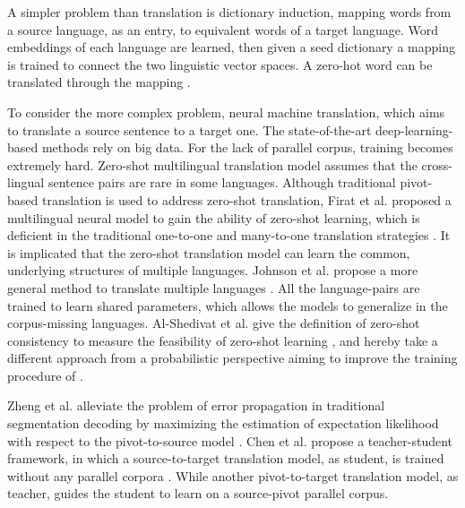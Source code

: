 \documentclass[sigconf, review]{acmart}
\begin{document}
A simpler problem than translation is dictionary induction, mapping words from a source language, as an entry, to equivalent words of a target language. Word embeddings of each language are learned, then given a seed dictionary a mapping is trained to connect the two linguistic vector spaces. A zero-hot word can be translated through the mapping \cite{nakashole2017knowledge}.

To consider the more complex problem, neural machine translation, which aims to translate a source sentence to a target one. The state-of-the-art deep-learning-based methods rely on big data. For the lack of parallel corpus, training becomes extremely hard. Zero-shot multilingual translation model assumes that the cross-lingual sentence pairs are rare in some languages. Although traditional pivot-based translation is used to address zero-shot translation, Firat et al. proposed a multilingual neural model to gain the ability of zero-shot learning, which is deficient in the traditional one-to-one and many-to-one translation strategies \cite{firat2016zero}. It is implicated that the zero-shot translation model can learn the common, underlying structures of multiple languages. Johnson et al. propose a more general method to translate multiple languages \cite{johnson2017google}. All the language-pairs are trained to learn shared parameters, which allows the models to generalize in the corpus-missing languages. Al-Shedivat et al. give the definition of zero-shot consistency to measure the feasibility of zero-shot learning \cite{al2019consistency}, and hereby take a different approach from a probabilistic perspective aiming to improve the training procedure of \cite{johnson2017google}. 

Zheng et al. alleviate the problem of error propagation in traditional segmentation decoding by maximizing the estimation of expectation likelihood with respect to the pivot-to-source model \cite{zheng2017maximum}. Chen et al. propose a teacher-student framework, in which a source-to-target translation model, as student, is trained without any parallel corpora \cite{chen2017teacher}. While another pivot-to-target translation model, as teacher, guides the student to learn on a source-pivot parallel corpus.
\end{document}
